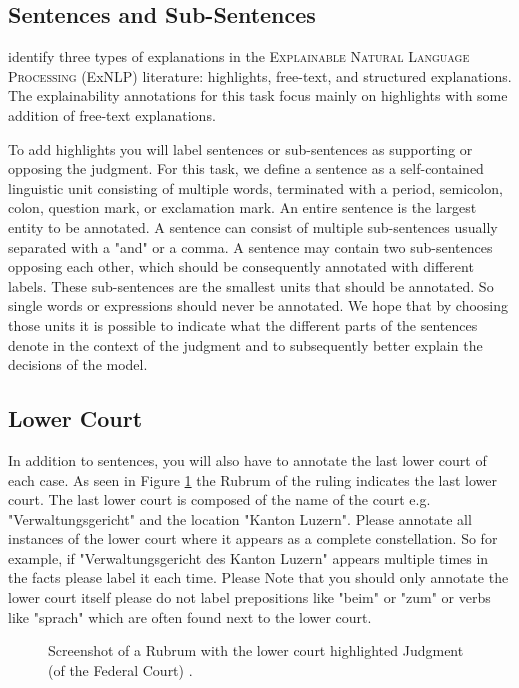 \documentclass{article}
\begin{document}
\subsection{Sentences and Sub-Sentences}
\cite{TMTE_2021} identify three types of explanations in the \textsc{Explainable Natural Language Processing} (ExNLP) literature: highlights, free-text, and structured explanations. The explainability annotations for this task focus mainly on highlights with some addition of free-text explanations. 

To add highlights you will label sentences or sub-sentences as supporting or opposing the judgment. For this task, we define a sentence as a self-contained linguistic unit consisting of multiple words, terminated with a period, semicolon, colon, question mark, or exclamation mark. An entire sentence is the largest entity to be annotated. A sentence can consist of multiple sub-sentences usually separated with a "and" or a comma. A sentence may contain two sub-sentences opposing each other, which should be consequently annotated with different labels. These sub-sentences are the smallest units that should be annotated. So single words or expressions should never be annotated. We hope that by choosing those units it is possible to indicate what the different parts of the sentences denote in the context of the judgment and to subsequently better explain the decisions of the model.

\subsection{Lower Court}
In addition to sentences, you will also have to annotate the last lower court of each case. As seen in Figure \ref{rubrum} the Rubrum of the ruling indicates the last lower court. The last lower court is composed of the name of the court e.g. "Verwaltungsgericht" and the location "Kanton Luzern". Please annotate all instances of the lower court where it appears as a complete constellation. So for example, if "Verwaltungsgericht des Kanton Luzern" appears multiple times in the facts please label it each time. Please Note that you should only annotate the lower court itself please do not label prepositions like "beim" or "zum" or verbs like "sprach" which are often found next to the lower court.

\begin{figure}[H]
     \caption{Screenshot of a Rubrum with the lower court highlighted Judgment (of the Federal Court) \citeauthor{9C-424-2017}. }
     \label{rubrum}
\end{figure}
\end{document}
